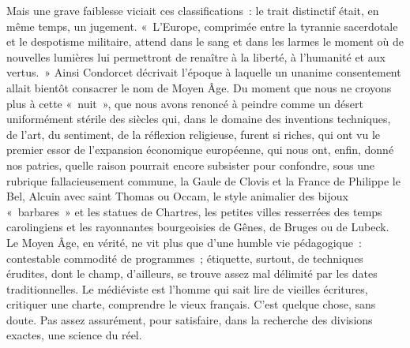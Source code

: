 \documentclass[french,twoside]{book} %
\newcommand{\astermono}{\medskip\centerline{\color{rubric}\large\selectfont{\syms ✻}}\medskip\par}%
\begin{document}
Mais une grave faiblesse viciait ces classifications : le trait distinctif était, en même temps, un jugement. « L’Europe, comprimée entre la tyrannie sacerdotale et le despotisme militaire, attend dans le sang et  
\label{p92} dans les larmes le moment où de nouvelles lumières lui permettront de renaître à la liberté, à l’humanité et aux vertus. » Ainsi Condorcet décrivait l’époque à laquelle un unanime consentement allait bientôt consacrer le nom de Moyen Âge. Du moment que nous ne croyons plus à cette « nuit », que nous avons renoncé à peindre comme un désert uniformément stérile des siècles qui, dans le domaine des inventions techniques, de l’art, du sentiment, de la réflexion religieuse, furent si riches, qui ont vu le premier essor de l’expansion économique européenne, qui nous ont, enfin, donné nos patries, quelle raison pourrait encore subsister pour confondre, sous une rubrique fallacieusement commune, la Gaule de Clovis et la France de Philippe le Bel, Alcuin avec saint Thomas ou Occam, le style animalier des bijoux « barbares » et les statues de Chartres, les petites villes res­serrées des temps carolingiens et les rayonnantes bourgeoisies de Gênes, de Bruges ou de Lubeck. Le Moyen Âge, en vérité, ne vit plus que d’une humble vie pédagogique : contestable commodité de programmes ; éti­quette, surtout, de techniques érudites, dont le champ, d’ailleurs, se trouve assez mal délimité par les dates traditionnelles. Le médiéviste est l’homme qui sait lire de vieilles écritures, critiquer une charte, comprendre le vieux français. C’est quelque chose, sans doute. Pas assez assurément, pour satisfaire, dans la recherche des divisions exactes, une science du réel.\par

\astermono
\end{document}

